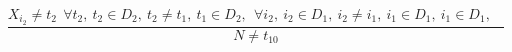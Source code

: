 $$\frac{X_{i_{2}} \neq t_{2}~~\forall t_{2},~t_{2} \in D_{2},~t_{2} \neq t_{1},~t_{1} \in D_{2},~~\forall i_{2},~i_{2} \in D_{1},~i_{2} \neq i_{1},~i_{1} \in D_{1},~i_{1} \in D_{1},~~~~}{N \neq t_{10} }$$ 